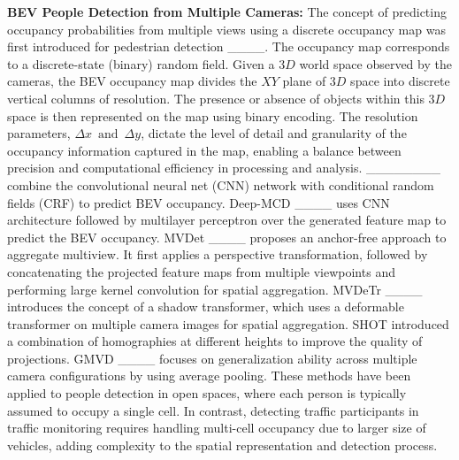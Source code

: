 
\textbf{BEV People Detection from Multiple Cameras:} The concept of predicting occupancy probabilities from multiple views using a discrete occupancy map was first introduced for pedestrian detection ____. The occupancy map corresponds to a discrete-state (binary) random field. Given a $3D$ world space observed by the cameras, the BEV occupancy map divides the $XY$ plane of $3D$ space into discrete vertical columns of resolution. The presence or absence of objects within this $3D$ space is then represented on the map using binary encoding. The resolution parameters, $\Delta x\, \text{ and }\, \Delta y$, dictate the level of detail and granularity of the occupancy information captured in the map, enabling a balance between precision and computational efficiency in processing and analysis. ________ combine the convolutional neural net (CNN) network with conditional random fields (CRF) to predict BEV occupancy. Deep-MCD ____ uses CNN architecture followed by multilayer perceptron over the generated feature map to predict the BEV occupancy. MVDet ____ proposes an anchor-free approach to aggregate multiview. It first applies a perspective transformation, followed by concatenating the projected feature maps from multiple viewpoints and performing large kernel convolution for spatial aggregation. MVDeTr ____ introduces the concept of a shadow transformer, which uses a deformable transformer on multiple camera images for spatial aggregation. SHOT \cite {song2021stacked} introduced a combination of homographies at different heights to improve the quality of projections. GMVD ____ focuses on generalization ability across multiple camera configurations by using average pooling. These methods have been applied to people detection in open spaces, where each person is typically assumed to occupy a single cell. In contrast, detecting traffic participants in traffic monitoring requires handling multi-cell occupancy due to larger size of vehicles, adding complexity to the spatial representation and detection process.